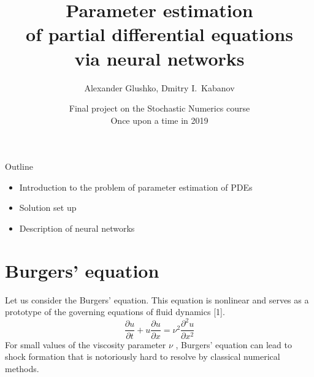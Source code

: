 \documentclass{beamer}
\title{\vspace{-0.5cm}Parameter estimation\\of partial differential equations\\via neural networks}
\author{Alexander Glushko, Dmitry I.\ Kabanov}
\date{Final project on the Stochastic Numerics course\\Once upon a time in 2019}
\begin{document}
\maketitle

\begin{frame}{Outline}
\begin{itemize}
    \item Introduction to the problem of parameter estimation of PDEs
    \item Solution set up
    \item Description of neural networks
\end{itemize}
\end{frame}









\section{Burgers' equation}

\begin{frame}

Let us consider the Burgers' equation. This equation is nonlinear and serves as a prototype of the governing equations of fluid dynamics [1]. 
\begin{equation}
    \frac{\partial u}{\partial t} + u \frac{\partial u}{\partial x} = \nu^2 \frac{\partial^2 u}{\partial x^2}
\end{equation}
For small values of the viscosity parameter $\nu$ , Burgers' equation can lead to shock formation that is notoriously hard to resolve by classical numerical methods. 

\end{frame}
\end{document}
